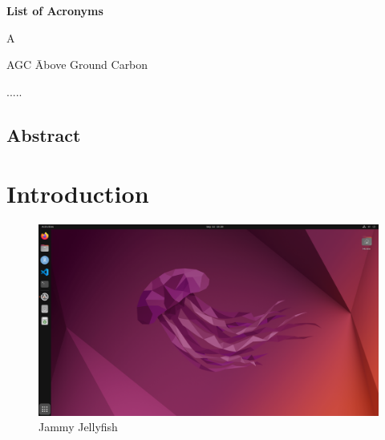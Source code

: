 \documentclass[12pt,a4paper]{report}%
\begin{document}
\newpage
\listofmyequations
\newpage \begin{center} \huge\textbf{List of Acronyms} \end{center} \vspace{1em}

A \begin{tabbing} AGC \hspace{1cm} \= Above Ground Carbon \\ \end{tabbing}


.....

\newpage
\section*{\centering Abstract}
\doublespacing
\flushleft
\hspace{1cm} 

\newpage
\clearpage  %

\chapter{Introduction}






\begin{figure}
\centering
\includegraphics[width=15cm]{photos/Jammy.png}
\caption{Jammy Jellyfish}
\label{fig:figure1}
\end{figure}
\end{document}
